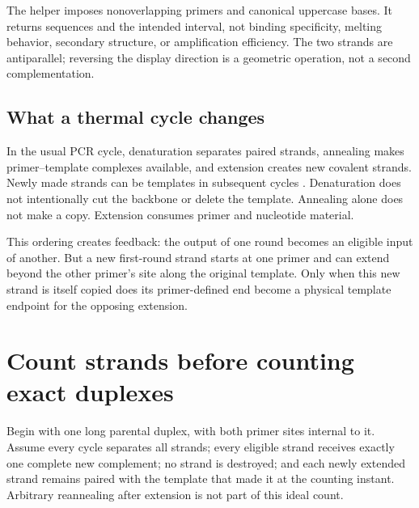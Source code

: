 
The helper imposes nonoverlapping primers and canonical uppercase bases. It returns sequences and the intended interval, not binding specificity, melting behavior, secondary structure, or amplification efficiency. The two strands are antiparallel; reversing the display direction is a geometric operation, not a second complementation.

\subsection{What a thermal cycle changes}
In the usual PCR cycle, denaturation separates paired strands, annealing makes primer--template complexes available, and extension creates new covalent strands. Newly made strands can be templates in subsequent cycles \cite{neb}. Denaturation does not intentionally cut the backbone or delete the template. Annealing alone does not make a copy. Extension consumes primer and nucleotide material.

This ordering creates feedback: the output of one round becomes an eligible input of another. But a new first-round strand starts at one primer and can extend beyond the other primer's site along the original template. Only when this new strand is itself copied does its primer-defined end become a physical template endpoint for the opposing extension.


\section{Count strands before counting exact duplexes}
Begin with one long parental duplex, with both primer sites internal to it. Assume every cycle separates all strands; every eligible strand receives exactly one complete new complement; no strand is destroyed; and each newly extended strand remains paired with the template that made it at the counting instant. Arbitrary reannealing after extension is not part of this ideal count.

